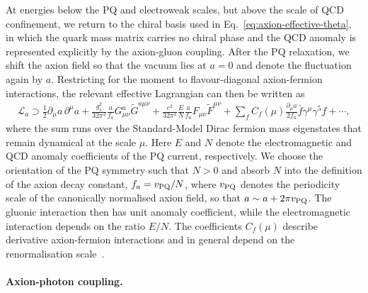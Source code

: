 \documentclass[review]{elsarticle}
\numberwithin{equation}{section}
\numberwithin{table}{section}
\numberwithin{figure}{section}
\begin{document}
At energies below the PQ and electroweak scales, but above the scale of QCD confinement, we return to the chiral basis used in Eq.~\eqref{eq:axion-effective-theta}, in which the quark mass matrix carries no chiral phase and the QCD anomaly is represented explicitly by the axion-gluon coupling. After the PQ relaxation, we shift the axion field so that the vacuum lies at $a=0$ and denote the fluctuation again by $a$. Restricting for the moment to flavour-diagonal axion-fermion interactions, the relevant effective Lagrangian can then be written as
\begin{align}
    \mathcal{L}_a
    \supset \frac{1}{2}\partial_\mu a\,\partial^\mu a
    + \frac{g_s^2}{32\pi^2} \frac{a}{f_a}G^a_{\mu\nu}\widetilde G^{a\mu\nu} + \frac{e^2}{32\pi^2} \frac{E}{N} \frac{a}{f_a} F_{\mu\nu}\widetilde F^{\mu\nu}
    + \sum_f C_f(\mu) \frac{\partial_\mu a}{2f_a}
    \bar f\gamma^\mu\gamma^5f +\cdots ,
    \label{eq:axion-general-low-energy-EFT}
\end{align}
where the sum runs over the Standard-Model Dirac fermion mass eigenstates that remain dynamical at the scale $\mu$. 
Here $E$ and $N$ denote the electromagnetic and QCD anomaly coefficients of the PQ current, respectively. We choose the orientation of the PQ symmetry such that $N>0$ and absorb $N$ into the definition of the axion decay constant, $f_a=v_{\rm PQ}/N$, where $v_{\rm PQ}$ denotes the periodicity scale of the canonically normalised axion field, so that $a\sim a+2\pi v_{\rm PQ}$. The gluonic interaction then has unit anomaly coefficient, while the electromagnetic interaction depends on the ratio $E/N$. The coefficients $C_f(\mu)$ describe derivative axion-fermion interactions and in general depend on the renormalisation scale~\cite{Srednicki:1985xd,Georgi:1986df,Bauer:2020jbp,Choi:2021kuy}.

\paragraph{Axion-photon coupling.}
\end{document}
